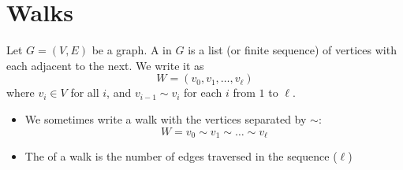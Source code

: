 \documentclass
[ignorenonframetext,14pt,aspectratio=169]
{ngelessonslides}
\begin{document}

\tableofcontents


\section{Walks}

\begin{frame}[label=walk-def]
\begin{definition}
    Let $G=(V,E)$ be a graph.
    A  in $G$ is a list (or finite sequence) of vertices
    with each adjacent to the next.  We write it as
    \[
        W = (v_0,v_1,\dots,v_\ell)
    \]
    where $v_i \in V$ for all $i$, and $v_{i-1} \sim v_i$ for each $i$ from $1$ to $\ell$.
\end{definition}
\begin{itemize}
\item We sometimes write a walk with the vertices separated by $\sim$:
\[
    W = v_0 \sim v_1 \sim \dots \sim v_\ell
\]
\item The  of a walk is the number of edges traversed in the sequence
($\ell$)
\end{itemize}
\end{frame}
\end{document}
